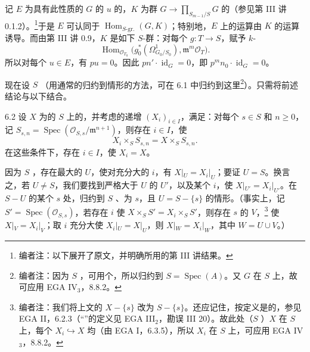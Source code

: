 记 $E$ 为具有此性质的 $G$ 的 $u$ 的，$K$ 为群 $G\to\prod_{S_{m-1}/S}G$ 的（参见第 III 讲 0.1.2）。\footnote{编者注：以下展开了原文，并明确所用的第 III 讲结果。}于是 $E$ 可认同于 $\operatorname{Hom}_{S\text{-gr.}}(G,K)$；特别地，$E$ 上的运算由 $K$ 的运算诱导。而由第 III 讲 0.9，$K$ 是如下 $S$-群：对每个 $g:T\to S$，赋予 $k$-
\[\operatorname{Hom}_{\mathcal O_{T_0}}\bigl(g_0^*(\Omega^1_{G_0/S_0}),\mathfrak m^m\mathcal O_T\bigr).\]
所以对每个 $u\in E$，有 $pu=0$。因此 $pn'\cdot\operatorname{id}_G=0$，即 $p^mn_0\cdot\operatorname{id}_G=0$。

现在设 $S$ （用通常的归约到情形的方法，可在 6.1 中归约到这里\footnote{编者注：因为 $S$ ，可用个，所以归约到 $S=\operatorname{Spec}(A)$。又 $G$ 在 $S$ 上，故可应用 EGA IV$_3$，8.8.2。}）。只需将前述结论与以下结合。
\begin{SGAresult}{}{6.2}
设 $X$ 为的 $S$ 上的，并考虑的递增 $(X_i)_{i\in I}$，满足：对每个 $s\in S$ 和 $n\geq0$，记 $S_{s,n}=\operatorname{Spec}(\mathcal O_{S,s}/\mathfrak m^{n+1})$，则存在 $i\in I$，使
\[X_i\times_S S_{s,n}=X\times_S S_{s,n}.\]
在这些条件下，存在 $i\in I$，使 $X_i=X$。
\end{SGAresult}
因为 $S$ ，存在最大的 $U$，使对充分大的 $i$，有 $X|_U=X_i|_U$；要证 $U=S$。换言之，若 $U\ne S$，我们要找到严格大于 $U$ 的 $U'$，以及某个 $i$，使 $X|_{U'}=X_i|_{U'}$。在 $S-U$ 的某个 $s$ 处，归约到 $S$ 、为 $s$，且 $U=S-\{s\}$ 的情形。（事实上，记 $S'=\operatorname{Spec}(\mathcal O_{S,s})$，若存在 $i$ 使 $X\times_S S'=X_i\times_S S'$，则存在 $s$ 的 $V$，\footnote{编者注：我们将上文的 $X-\{s\}$ 改为 $S-\{s\}$。还应记住，按定义是的，参见 EGA II，6.2.3（“”的定义见 EGA III$_2$，勘误 III 20）。故此处（$S$ ）$X$ 在 $S$ 上，每个 $X_i\hookrightarrow X$ 均（由 EGA I，6.3.5），所以 $X_i$ 在 $S$ 上，可应用 EGA IV$_3$，8.8.2。}
使 $X|_V=X_i|_V$；取 $i$ 充分大使 $X_i|_U=X|_U$，则 $X|_W=X_i|_W$，其中 $W=U\cup V$。）

